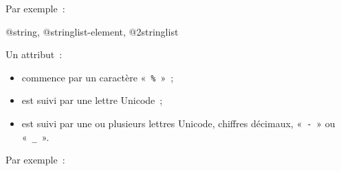 Par exemple~:
\begin{galgas}
 @string, @stringlist-element, @2stringlist
\end{galgas}





Un attribut~:
\begin{itemize}
  \item commence par un caractère «~\texttt{\%}~»~;
  \item est suivi par une lettre Unicode~;
  \item est suivi par une ou plusieurs lettres Unicode, chiffres décimaux, «~\texttt{-}~» ou «~\texttt{\_}~».
\end{itemize}

Par exemple~:
\begin{galgas}
\end{galgas}


